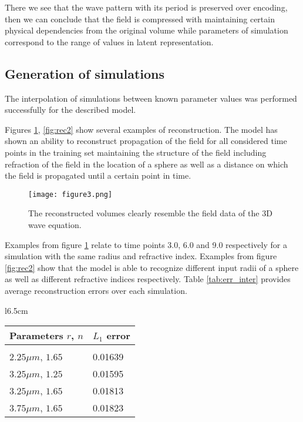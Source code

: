 \documentclass{article} %
\begin{document}
There we see that the wave pattern with its period is preserved over encoding, then we can conclude that the field is compressed with maintaining certain physical dependencies from the original volume while parameters of simulation correspond to the range of values in latent representation.

\subsection{Generation of simulations}

The interpolation of simulations between known parameter values was performed successfully for the described model. 

Figures \ref{fig:rec}, \ref{fig:rec2} show several examples of reconstruction. 
The model has shown an ability to reconstruct propagation of the field for all considered time points in the training set maintaining the structure of the field including refraction of the field in the location of a sphere as well as a distance on which the field is propagated until a certain point in time.

\begin{figure}[h!]
  \centering
  \texttt{[image: figure3.png]}
  \caption{The reconstructed volumes clearly resemble the field data of the 3D wave equation.}
  \label{fig:rec}
\end{figure}

Examples from figure \ref{fig:rec} relate to time points 3.0, 6.0 and 9.0 respectively for a simulation with the same radius and refractive index. Examples from figure \ref{fig:rec2} show that the model is able to recognize different input radii of a sphere as well as different refractive indices respectively. Table \ref{tab:err_inter} provides average reconstruction errors over each simulation. 

\begin{wraptable}[9]{l}{6.5cm}
\vspace*{-4mm}
\caption{Reconstruction error for interpolation}
\label{tab:err_inter}
\begin{center}
\begin{tabular}{ll}
\multicolumn{1}{c}{\bf Parameters $\displaystyle r$, $\displaystyle n$ }  &\multicolumn{1}{c}{\bf $\displaystyle L_1$ error}
\\ \hline \\
$2.25\mu m$, $1.65$ &0.01639\\
 $3.25\mu m$, $1.25$ &0.01595\\
 $3.25\mu m$, $1.65$  &0.01813 \\
 $3.75\mu m$, $1.65$ &0.01823 \\
\end{tabular}
\end{center}
\end{wraptable}
\end{document}
